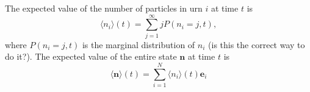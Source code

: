 \documentclass[a4paper,11pt]{article}
\numberwithin{equation}{section}
\newcommand{\V}[1]{\mathbf{#1}}
\begin{document}
The expected value of the number of particles in urn \(i\) at time \(t\) is
\begin{equation*}
    \langle n_i \rangle(t) = \sum_{j=1}^\infty j P(n_i = j,t),
\end{equation*}
where \(P(n_i = j,t)\) is the marginal distribution of \(n_i\) (is this the
correct way to do it?). The expected value of the entire state \(\V{n}\) at time \(t\) is
\begin{equation*}
    \langle \V{n} \rangle(t) = \sum_{i=1}^N \langle n_i \rangle(t) \V{e}_i
\end{equation*}


\end{document}

